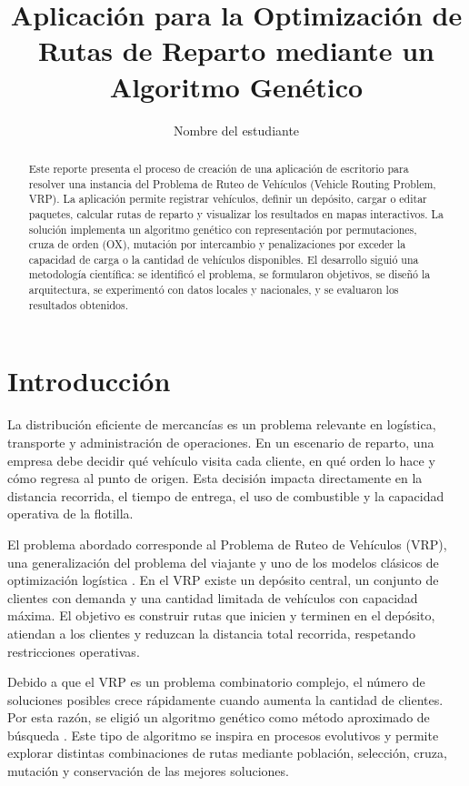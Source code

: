 \documentclass[runningheads]{llncs}
\title{Aplicación para la Optimización de Rutas de Reparto mediante un Algoritmo Genético}
\author{Nombre del estudiante}
\institute{Evaluación Ordinaria}
\begin{document}
\maketitle

\begin{abstract}
Este reporte presenta el proceso de creación de una aplicación de escritorio para resolver una instancia del Problema de Ruteo de Vehículos (Vehicle Routing Problem, VRP). La aplicación permite registrar vehículos, definir un depósito, cargar o editar paquetes, calcular rutas de reparto y visualizar los resultados en mapas interactivos. La solución implementa un algoritmo genético con representación por permutaciones, cruza de orden (OX), mutación por intercambio y penalizaciones por exceder la capacidad de carga o la cantidad de vehículos disponibles. El desarrollo siguió una metodología científica: se identificó el problema, se formularon objetivos, se diseñó la arquitectura, se experimentó con datos locales y nacionales, y se evaluaron los resultados obtenidos.

\end{abstract}

\section{Introducción}

La distribución eficiente de mercancías es un problema relevante en logística, transporte y administración de operaciones. En un escenario de reparto, una empresa debe decidir qué vehículo visita cada cliente, en qué orden lo hace y cómo regresa al punto de origen. Esta decisión impacta directamente en la distancia recorrida, el tiempo de entrega, el uso de combustible y la capacidad operativa de la flotilla.

El problema abordado corresponde al Problema de Ruteo de Vehículos (VRP), una generalización del problema del viajante y uno de los modelos clásicos de optimización logística \cite{toth2014vehicle}. En el VRP existe un depósito central, un conjunto de clientes con demanda y una cantidad limitada de vehículos con capacidad máxima. El objetivo es construir rutas que inicien y terminen en el depósito, atiendan a los clientes y reduzcan la distancia total recorrida, respetando restricciones operativas.

Debido a que el VRP es un problema combinatorio complejo, el número de soluciones posibles crece rápidamente cuando aumenta la cantidad de clientes. Por esta razón, se eligió un algoritmo genético como método aproximado de búsqueda \cite{goldberg1989genetic}. Este tipo de algoritmo se inspira en procesos evolutivos y permite explorar distintas combinaciones de rutas mediante población, selección, cruza, mutación y conservación de las mejores soluciones.
\end{document}
